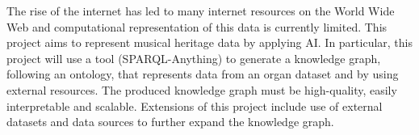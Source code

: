 The rise of the internet has led to many internet resources on the World Wide Web and computational representation of this data is currently limited. This project aims to represent musical heritage data by applying AI. In particular, this project will use a tool (SPARQL-Anything) to generate a knowledge graph, following an ontology, that represents data from an organ dataset and by using external resources. The produced knowledge graph must be high-quality, easily interpretable and scalable. Extensions of this project include use of external datasets and data sources to further expand the knowledge graph. 